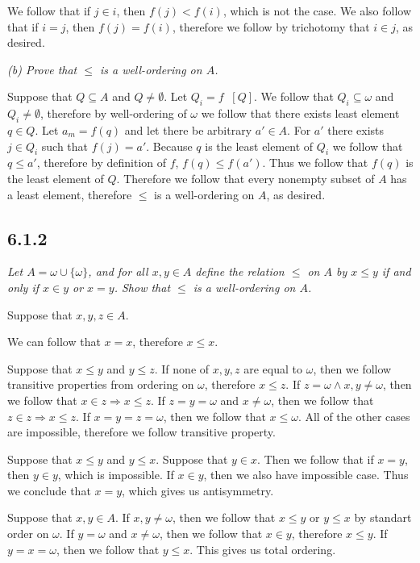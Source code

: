 \documentclass[11pt,oneside,titlepage]{book}
\DeclareMathOperator \inv {^{-1}}
\DeclareMathOperator \ra {\Rightarrow}
\begin{document}
We follow that if $j \in i$, then $f(j) < f(i)$, which is not the case.
We also follow that if $i = j$, then $f(j) = f(i)$, therefore we follow by trichotomy that
$i \in j$, as desired.


\textit{(b) Prove that $\leq$ is a well-ordering on $A$.}

Suppose that $Q \subseteq A$ and $Q \neq \emptyset$. Let $Q_i = f\inv[Q]$. We
follow that $Q_i \subseteq \omega$ and $Q_i \neq \emptyset$, therefore by
well-ordering of $\omega$ we follow that there exists least element $q \in Q$.
Let $a_m = f(q)$ and let there be arbitrary $a' \in A$.
For $a'$ there exists $j \in Q_i$  such that $f(j) = a'$.
Because $q$ is the least element of $Q_i$ we follow that $q \leq a'$, therefore
by definition of $f$, $f(q) \leq f(a')$. Thus we follow that
$f(q)$ is the least element of $Q$. Therefore we follow that
every nonempty subset of $A$ has a least element, therefore $\leq$ is
a well-ordering on $A$, as desired.

\subsection*{6.1.2}

\textit{Let $A = \omega \cup \{\omega\}$, and for all $x,y \in A$ define
  the relation $\leq$ on $A$ by $x \leq y$ if and only if $x \in y$ or $x = y$.
  Show that $\leq$ is a well-ordering on $A$.}

Suppose that $x, y, z \in A$. 

We can follow that $x = x$, therefore $x \leq x$.

Suppose that $x \leq y$ and $y \leq z$.
If none of $x, y, z$ are equal to $\omega$, then we follow transitive properties
from ordering on $\omega$, therefore $x \leq z$.
If $z = \omega \land x, y \neq \omega$, then we follow that $x \in z \ra x \leq z$.
If $z = y = \omega$ and $x \neq \omega$, then we follow that $z \in z \ra x \leq z$.
If $x = y = z = \omega$, then we follow that $x \leq \omega$.
All of the other cases are impossible, therefore we follow transitive property.


Suppose that $x \leq y$ and $y \leq x$. Suppose that $y \in x$. Then we follow that
if $x = y$, then $y \in y$, which is impossible. If $x \in y$, then we also have impossible
case. Thus we conclude that $x = y$, which gives us antisymmetry.

Suppose that $x, y \in A$. If $x, y \neq \omega$, then we follow that $x \leq y$
or $y \leq x$ by standart order on $\omega$. If $y = \omega$ and $x \neq \omega$, then
we follow that $x \in y$, therefore $x \leq y$. If $y = x = \omega$, then we follow that
$y \leq x$. This gives us total ordering.
\end{document}
